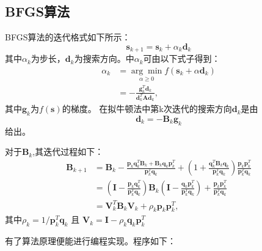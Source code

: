\documentclass[twocolumn]{ctexart}
\begin{document}
\subsection{BFGS算法}
\par BFGS算法的迭代格式如下所示：
\[\mathbf{s}_{k+1}=\mathbf{s}_{k}+\alpha_{k} \mathbf{d}_{k}\]
其中$ \alpha_k $为步长，$ \mathbf{d}_k $为搜索方向。中$ \alpha_k $可由以下式子得到：
\[\begin{aligned}
\alpha_{k} &=\underset{\alpha \geq 0}{\arg \min } f\left(\mathbf{s}_{k}+\alpha \mathbf{d}_{k}\right) \\
&=-\frac{\mathbf{g}_{k}^{T} \mathbf{d}_{k}}{\mathbf{d}_{k}^{T} \mathbf{A d}_{k}},
\end{aligned}\]其中$ \mathbf{g}_k $为$ f(\mathbf{s}) $的梯度。
 在拟牛顿法中第k次迭代的搜索方向$ \mathbf{d}_k $是由
\[\mathbf{d}_{k}=-\mathbf{B}_{k} \mathbf{g}_{k}\]给出。
\par 对于$ \mathbf{B}_k $,其迭代过程如下：
\[
\begin{aligned}
\mathbf{B}_{k+1} &=\mathbf{B}_{k}-\frac{\mathbf{p}_{k} \mathbf{q}_{k}^{T} \mathbf{B}_{k}+\mathbf{B}_{k} \mathbf{q}_{k} \mathbf{p}_{k}^{T}}{\mathbf{p}_{k}^{T} \mathbf{q}_{k}}+\left(1+\frac{\mathbf{q}_{k}^{T} \mathbf{B}_{k} \mathbf{q}_{k}}{\mathbf{p}_{k}^{T} \mathbf{q}_{k}}\right) \frac{\mathbf{p}_{k} \mathbf{p}_{k}^{T}}{\mathbf{p}_{k}^{T} \mathbf{q}_{k}} \\
&=\left(\mathbf{I}-\frac{\mathbf{p}_{k} \mathbf{q}_{k}^{T}}{\mathbf{p}_{k}^{T} \mathbf{q}_{k}}\right) \mathbf{B}_{k}\left(\mathbf{I}-\frac{\mathbf{q}_{k} \mathbf{p}_{k}^{T}}{\mathbf{p}_{k}^{T} \mathbf{q}_{k}}\right)+\frac{\mathbf{p}_{k} \mathbf{p}_{k}^{T}}{\mathbf{p}_{k}^{T} \mathbf{q}_{k}} \\
&=\mathbf{V}_{k}^{T} \mathbf{B}_{k} \mathbf{V}_{k}+\rho_{k} \mathbf{p}_{k} \mathbf{p}_{k}^{T},
\end{aligned}
\]
其中$\rho_{k}=1 / \mathbf{p}_{k}^{T} \mathbf{q}_{k}$ 且  $\mathbf{V}_{k}=\mathbf{I}-\rho_{k} \mathbf{q}_{k} \mathbf{p}_{k}^{T}$
\par 有了算法原理便能进行编程实现。程序如下：
\end{document}
